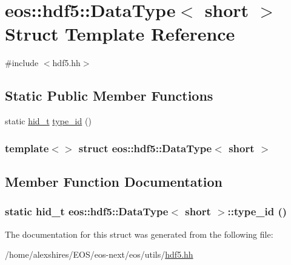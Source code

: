 \hypertarget{structeos_1_1hdf5_1_1DataType_3_01short_01_4}{
\section{eos::hdf5::DataType$<$ short $>$ Struct Template Reference}
\label{structeos_1_1hdf5_1_1DataType_3_01short_01_4}
}


{\ttfamily \#include $<$hdf5.hh$>$}\subsection*{Static Public Member Functions}
\begin{DoxyCompactItemize}
\item 
static \hyperlink{namespaceeos_1_1hdf5_a5bd5e209f1bf36cdc5551465dacf2e74}{hid\_\-t} \hyperlink{structeos_1_1hdf5_1_1DataType_3_01short_01_4_aff06c6712c9e5f6c29c77de87a238d59}{type\_\-id} ()
\end{DoxyCompactItemize}
\subsubsection*{template$<$$>$ struct eos::hdf5::DataType$<$ short $>$}



\subsection{Member Function Documentation}
\hypertarget{structeos_1_1hdf5_1_1DataType_3_01short_01_4_aff06c6712c9e5f6c29c77de87a238d59}{
\subsubsection[{type\_\-id}]{\setlength{\rightskip}{0pt plus 5cm}static {\bf hid\_\-t} {\bf eos::hdf5::DataType}$<$ short $>$::type\_\-id ()}}
\label{structeos_1_1hdf5_1_1DataType_3_01short_01_4_aff06c6712c9e5f6c29c77de87a238d59}


The documentation for this struct was generated from the following file:\begin{DoxyCompactItemize}
\item 
/home/alexshires/EOS/eos-\/next/eos/utils/\hyperlink{hdf5_8hh}{hdf5.hh}\end{DoxyCompactItemize}
